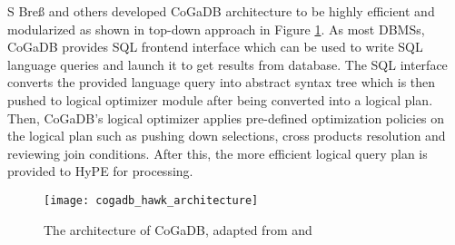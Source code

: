 S Bre{ß} and others developed CoGaDB architecture to be highly efficient and modularized as shown in top-down approach in Figure \ref{fig:cogadbarch}.
As most DBMSs, CoGaDB provides SQL frontend interface which can be used to write SQL language queries and launch it to get results from database. The SQL interface converts the provided language query into abstract syntax tree which is then pushed to logical optimizer module after being converted into a logical plan. Then, CoGaDB's logical optimizer applies pre-defined optimization policies on the logical plan such as pushing down selections, cross products resolution and reviewing join conditions. After this, the more efficient logical query plan is provided to HyPE for processing.
\begin{figure}
\texttt{[image: cogadb\_hawk\_architecture]}
\caption{The architecture of CoGaDB, adapted from \cite{cogadb_hawk} and \cite{cogadb_manual}}
\label{fig:cogadbarch}
\end{figure}